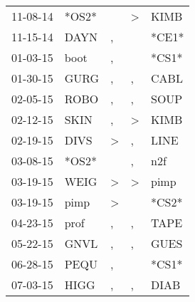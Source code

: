 \begin{supertabular}{p{0.07\textwidth}p{0.06\textwidth}p{0.02\textwidth}p{0.02\textwidth}p{0.06\textwidth}}
          11-08-14\textsuperscript{} &                            *OS2* &                  &     \textgreater &           KIMB\textsuperscript{} \\
          11-15-14\textsuperscript{} &           DAYN\textsuperscript{} &                , &                  &                            *CE1* \\
          01-03-15\textsuperscript{} &           boot\textsuperscript{} &                , &                  &                            *CS1* \\
          01-30-15\textsuperscript{} &           GURG\textsuperscript{} &                , &                , &           CABL\textsuperscript{} \\
          02-05-15\textsuperscript{} &           ROBO\textsuperscript{} &                , &                , &           SOUP\textsuperscript{} \\
          02-12-15\textsuperscript{} &           SKIN\textsuperscript{} &                , &     \textgreater &           KIMB\textsuperscript{} \\
          02-19-15\textsuperscript{} &           DIVS\textsuperscript{} &     \textgreater &                , &           LINE\textsuperscript{} \\
          03-08-15\textsuperscript{} &                            *OS2* &                  &                , &            n2f\textsuperscript{} \\
          03-19-15\textsuperscript{} &           WEIG\textsuperscript{} &     \textgreater &     \textgreater &           pimp\textsuperscript{} \\
          03-19-15\textsuperscript{} &           pimp\textsuperscript{} &     \textgreater &                  &                            *CS2* \\
          04-23-15\textsuperscript{} &           prof\textsuperscript{} &                , &                , &           TAPE\textsuperscript{} \\
          05-22-15\textsuperscript{} &           GNVL\textsuperscript{} &                , &                , &           GUES\textsuperscript{} \\
          06-28-15\textsuperscript{} &           PEQU\textsuperscript{} &                , &                  &                            *CS1* \\
          07-03-15\textsuperscript{} &           HIGG\textsuperscript{} &                , &                , &           DIAB\textsuperscript{} \\

\end{supertabular}
